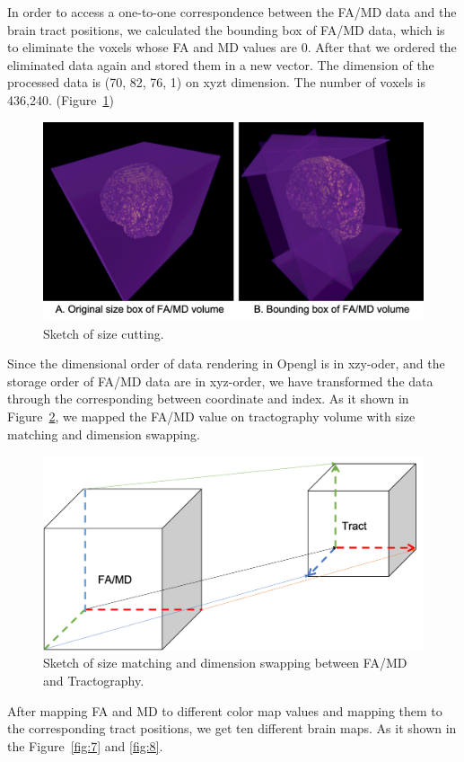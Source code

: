 \documentclass[hyperref, plainreport, noproblem]{cgvpub1}
\begin{document}
In order to access a one-to-one correspondence between the FA/MD data and the brain tract positions, we calculated the bounding box of FA/MD data, which is to eliminate the voxels whose FA and MD values are 0. After that we ordered the eliminated data again and stored them in a new vector. The dimension of the processed data is (70, 82, 76, 1) on xyzt dimension. The number of voxels is 436,240. (Figure~\ref{fig:5})

\begin{figure}[ht]
    \centering
    \includegraphics[width = 0.8\columnwidth]{5}
    \caption{Sketch of size cutting.}
    \label{fig:5}
\end{figure}	


Since the dimensional order of data rendering in Opengl is in xzy-oder, and the storage order of FA/MD data are in xyz-order, we have transformed the data through the corresponding between coordinate and index. As it shown in Figure~\ref{fig:6}, we mapped the FA/MD value on tractography volume with size matching and dimension swapping.

\begin{figure}[ht]
    \centering
    \includegraphics[width = 0.6\columnwidth]{6}
    \caption{Sketch of size matching and dimension swapping between FA/MD and Tractography.}
    \label{fig:6}
\end{figure}	

After mapping FA and MD to different color map values and mapping them to the corresponding tract positions, we get ten different brain maps. As it shown in the Figure~\ref{fig:7} and \ref{fig:8}.
\end{document}
